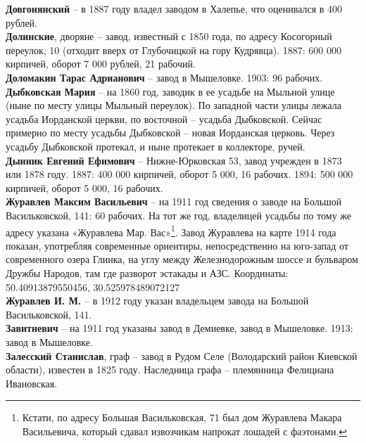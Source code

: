 \noindent\textbf{Довгонянский} – в 1887 году владел заводом в Халепье, что оценивался в 400 рублей.\\

\noindent\textbf{Долинские}, дворяне – завод, известный с 1850 года, по адресу Косогорный переулок, 10 (отходит вверх от Глубочицкой на гору Кудрявца). 1887: 600 000 кирпичей, оборот 7 000 рублей, 21 рабочий.\\

\noindent\textbf{Доломакин Тарас Адрианович} – завод в Мышеловке. 1903: 96 рабочих.\\


\noindent\textbf{Дыбковская Мария} – на 1860 год, заводик в ее усадьбе на Мыльной улице (ныне по месту улицы Мыльный переулок). По западной части улицы лежала усадьба Иорданской церкви, по восточной – усадьба Дыбковской. Сейчас примерно по месту усадьбы Дыбковской – новая Иорданская церковь. Через усадьбу Дыбковской протекал, и ныне протекает в коллекторе, ручей.\\

\noindent\textbf{Дынник Евгений Ефимович} – Нижне-Юрковская 53, завод учрежден в 1873 или 1878 году. 1887: 400 000 кирпичей, оборот 5 000, 16 рабочих. 1894: 500 000 кирпичей, оборот 5 000, 16 рабочих.\\

\noindent\textbf{Журавлев Максим Васильевич} – на 1911 год сведения о заводе на Большой Васильковской, 141: 60 рабочих. На тот же год, владелицей усадьбы по тому же адресу указана «Журавлева Мар. Вас»\footnote{Кстати, по адресу Большая Васильковская, 71 был дом Журавлева Макара Васильевича, который сдавал извозчикам напрокат лошадей с фаэтонами.}. Завод Журавлева на карте 1914 года показан, употребляя современные ориентиры, непосредственно на юго-запад от современного озера Глинка, на углу между Железнодорожным шоссе и бульваром Дружбы Народов, там где разворот эстакады и АЗС. Координаты: 50.40913879550456, 30.525978489072127\\

\noindent\textbf{Журавлев И. М.} – в 1912 году указан владельцем завода на Большой Васильковской, 141.\\

\noindent\textbf{Завитневич} – на 1911 год указаны завод в Демиевке, завод в Мышеловке. 1913: завод в Мышеловке.\\

\noindent\textbf{Залесский Станислав}, граф – завод в Рудом Селе (Володарский район Киевской области), известен в 1825 году. Наследница графа – племянница Фелициана Ивановская.\\

